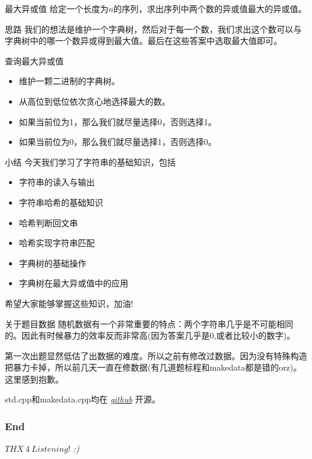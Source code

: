 \documentclass{ldr-simple-gray}
\begin{document}
  \begin{frame}{最大异或值}
    给定一个长度为$n$的序列，求出序列中两个数的异或值最大的异或值。

    \begin{block}{思路}
      我们的想法是维护一个字典树，然后对于每一个数，我们求出这个数可以与字典树中的哪一个数异或得到最大值。最后在这些答案中选取最大值即可。
    \end{block}

    \begin{block}{查询最大异或值}
      \begin{itemize}
        \item 维护一颗二进制的字典树。
        \item 从高位到低位依次贪心地选择最大的数。
        \item 如果当前位为1，那么我们就尽量选择0，否则选择1。
        \item 如果当前位为0，那么我们就尽量选择1，否则选择0。
      \end{itemize}
    \end{block}
  \end{frame}

  \begin{frame}{小结}
    今天我们学习了字符串的基础知识，包括
    \begin{itemize}
      \item 字符串的读入与输出
      \item 字符串哈希的基础知识
      \item 哈希判断回文串
      \item 哈希实现字符串匹配
      \item 字典树的基础操作
      \item 字典树在最大异或值中的应用
    \end{itemize}
    希望大家能够掌握这些知识，加油!
  \end{frame}

  \begin{frame}{关于题目数据}
    随机数据有一个非常重要的特点：两个字符串几乎是不可能相同的。因此有时候暴力的效率反而非常高(因为答案几乎是0,或者比较小的数字)。\newline

    第一次出题显然低估了出数据的难度。所以之前有修改过数据。因为没有特殊构造把暴力卡掉，所以前几天一直在修数据(有几道题标程和makedata都是错的orz)。这里感到抱歉。\newline

    std.cpp和makedata.cpp均在 \href{https://github.com/LogicShao/summerCampPPT/}{\emph{github}} 开源。
  \end{frame}

  \begin{frame} %
    \frametitle{End}
    \begin{center}
      \Huge{$THX\ 4\ Listening!$}
      \emph{:)}
    \end{center}
  \end{frame}
\end{document}
